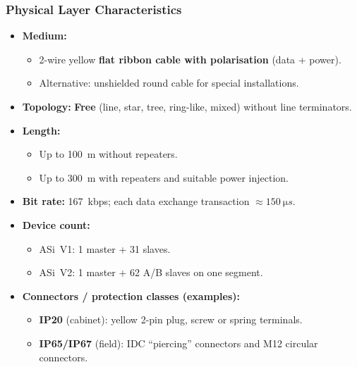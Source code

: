 \begin{frame}
	\frametitle{Physical Layer Characteristics}
	\begin{itemize}
		\item \textbf{Medium:}
		\begin{itemize}
			\item 2-wire yellow \textbf{flat ribbon cable with polarisation} (data + power).
			\item Alternative: unshielded round cable for special installations.
		\end{itemize}
		\item \textbf{Topology:} \textbf{Free} (line, star, tree, ring-like, mixed) without line terminators.
		\item \textbf{Length:}
		\begin{itemize}
			\item Up to \SI{100}{m} without repeaters.
			\item Up to \SI{300}{m} with repeaters and suitable power injection.
		\end{itemize}
		\item \textbf{Bit rate:} \SI{167}{kbps}; each data exchange transaction $\approx \SI{150}{\micro s}$.
		\item \textbf{Device count:}
		\begin{itemize}
			\item ASi~V1: 1 master + 31 slaves.
			\item ASi~V2: 1 master + 62 A/B slaves on one segment.
		\end{itemize}
		\item \textbf{Connectors / protection classes (examples):}
		\begin{itemize}
			\item \textbf{IP20} (cabinet): yellow 2-pin plug, screw or spring terminals.
			\item \textbf{IP65/IP67} (field): IDC “piercing” connectors and M12 circular connectors.
		\end{itemize}
	\end{itemize}
\end{frame}

